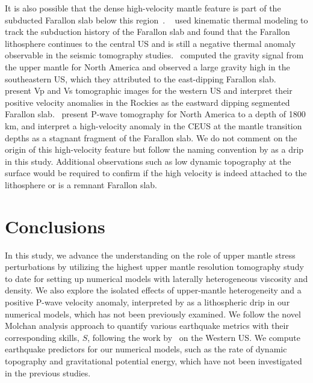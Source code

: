 \documentclass[draft,linenumbers]{agujournal2018}
\begin{document}
 It is also possible that the dense high-velocity mantle feature is part of the subducted Farallon slab below this region~\citep{schmid2002fate, mooney2010north, sigloch2008two, schmandt2010complex, sigloch2011mantle}. ~\citet{schmid2002fate} used kinematic thermal modeling to track the subduction history of the Farallon slab and found that the Farallon lithosphere continues to the central US and is still a negative thermal anomaly observable in the seismic tomography studies.~\citet{mooney2010north} computed the gravity signal from the upper mantle for North America and observed a large gravity high in the southeastern US, which they attributed to the east-dipping Farallon slab.~\citet{schmandt2010complex} present Vp and Vs tomographic images for the western US and interpret their positive velocity anomalies in the Rockies as the eastward dipping segmented Farallon slab.~\citet{sigloch2008two, sigloch2011mantle} present P-wave tomography for North America to a depth of 1800 km, and interpret a high-velocity anomaly in the CEUS at the mantle transition depths as a stagnant fragment of the Farallon slab.  We do not comment on the origin of this high-velocity feature but follow the naming convention by \citet{Biryol_2016} as a drip in this study. Additional observations such as low dynamic topography at the surface would be required to confirm if the high velocity is indeed attached to the lithosphere or is a remnant Farallon slab.
  
\section{Conclusions}

In this study, we advance the understanding on the role of upper mantle  stress perturbations  by utilizing the highest upper mantle resolution tomography study~\citep{Biryol_2016} to date for setting up numerical models with laterally heterogeneous viscosity and density. We also explore the isolated effects of upper-mantle heterogeneity and a positive P-wave velocity anomaly, interpreted by \citet{Biryol_2016} as a lithospheric drip in our numerical models, which has not been previously examined. We follow the novel Molchan analysis approach to quantify various earthquake metrics with their corresponding skills, $S$, following the work by~\citet{becker2015western} on the Western US. We compute earthquake predictors for our numerical models, such as the rate of dynamic topography and gravitational potential energy, which have not been investigated in the previous studies.
\end{document}
